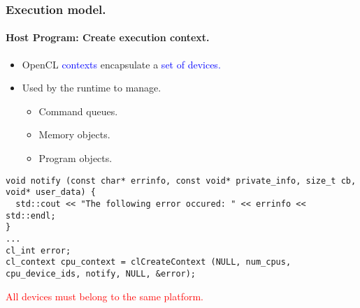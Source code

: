 \documentclass{beamer}
\begin{document}
\begin{frame}[fragile]
\frametitle{Execution model.}
\framesubtitle{Host Program: Create execution context.}

  \begin{itemize}
  \item OpenCL \textcolor{blue}{contexts} encapsulate a \textcolor{blue}{set of devices.}
  \item Used by the runtime to manage.
    \begin{itemize}
    \item Command queues.
    \item Memory objects.
    \item Program objects.
    \end{itemize}
  \end{itemize}

\begin{center}
\begin{minipage}{0.8\textwidth}
  \begin{lstlisting}
void notify (const char* errinfo, const void* private_info, size_t cb, void* user_data) {
  std::cout << "The following error occured: " << errinfo << std::endl;
}
...
cl_int error;
cl_context cpu_context = clCreateContext (NULL, num_cpus, cpu_device_ids, notify, NULL, &error);
  \end{lstlisting}
\end{minipage}
\end{center}
\begin{center}
\textcolor{red}{All devices must belong to the same platform.}
\end{center}
\end{frame}
\end{document}
